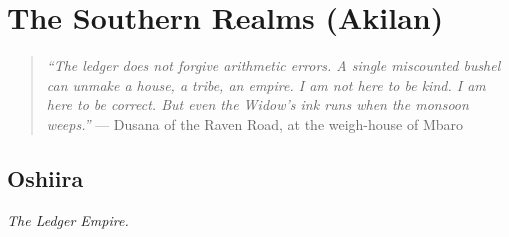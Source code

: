 \part{The Southern Realms (Akilan)}
\begin{quote}
  \small
  \textit{``The ledger does not forgive arithmetic errors. A single miscounted bushel can unmake a house, a tribe, an empire. I am not here to be kind. I am here to be correct. But even the Widow's ink runs when the monsoon weeps.''}
  \noindent --- Dusana of the Raven Road, at the weigh-house of Mbaro
  \end{quote}

\chapter{Oshiira}
\emph{The Ledger Empire.}

